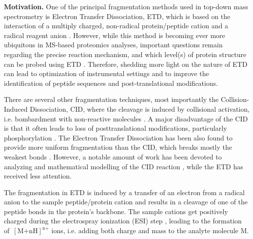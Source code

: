 \documentclass{llncs}
\begin{document}

\textbf{Motivation.} One of the principal fragmentation methods used in top-down mass spectrometry is Electron Transfer Dissociation, ETD, which is based on the interaction of a multiply charged, non-radical protein/peptide cation and a radical reagent anion \cite{Syka2004-rg,Zhurov2013-ua}. However, while this method is becoming ever more ubiquitous in MS-based proteomics analyses, important questions remain regarding the precise reaction mechanism, and which level(s) of protein structure can be probed using ETD \cite{Sohn2009-zv,Sohn2015-rp}. Therefore, shedding more light on the nature of ETD can lead to optimization of instrumental settings and to improve the identification of peptide sequences and post-translational modifications.

There are several other fragmentation techniques, most importantly the Col\-lision-Induced Dissociation, CID, where the cleavage is induced by collisional activation, i.e. bombardment with non-reactive molecules \cite{Mitchell_Wells2005-gn}. A major disadvantage of the CID is that it often leads to loss of posttranslational modifications, particularly phosphorylation \cite{Kim2012-yz}. The Electron Transfer Dissociation has been also found to provide more uniform fragmentation than the CID, which breaks mostly the weakest bonds \cite{Kim2012-yz,Zhurov2013-ua}. However, a notable amount of work has been devoted to analyzing and mathematical modelling of the CID reaction \cite{Zhang2004-fp,Zhang2005-jn,Wysocki2000-am}, while the ETD has received less attention.

The fragmentation in ETD is induced by a transfer of an electron from a radical anion to the sample peptide/protein cation and results in a cleavage of one of the peptide bonds  in the protein’s backbone. The sample cations get positively charged during the electrospray ionization (ESI) step \cite{Fenn1989-mp}, leading to the formation of~$[\text{M+nH}]^\text{n+}$ ions, i.e. adding both charge and mass to the analyte molecule M.
\end{document}
